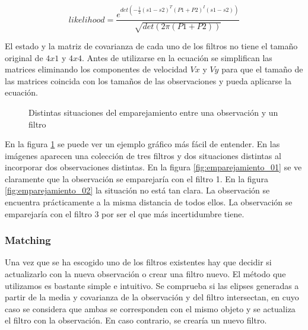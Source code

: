 \begin{equation}
\label{eq:likelihood}
likelihood = \frac{ e^{ det(-\frac{1}{2} (s1-s2)^T (P1+P2)^I (s1-s2) )} }
                  { \sqrt{ det(2\pi(P1+P2)) } }
\end{equation}

El estado y la matriz de covarianza de cada uno de los filtros no tiene el tamaño original de $4x1$ y $4x4$. Antes de utilizarse en la ecuación se simplifican las matrices eliminando los componentes de velocidad $Vx$ y $Vy$ para que el tamaño de las matrices coincida con los tamaños de las observaciones y pueda aplicarse la ecuación.\\

\begin{figure}[h]
  \centering
  \caption{Distintas situaciones del emparejamiento entre una observación y un filtro}
  \label{fig:emparejamientos}
\end{figure}

En la figura \ref{fig:emparejamientos} se puede ver un ejemplo gráfico más fácil de entender. En las imágenes aparecen una colección de tres filtros y dos situaciones distintas al incorporar dos observaciones distintas. En la figura \ref{fig:emparejamiento_01} se ve claramente que la observación se emparejaría con el filtro 1. En la figura \ref{fig:emparejamiento_02} la situación no está tan clara. La observación se encuentra prácticamente a la misma distancia de todos ellos. La observación se emparejaría con el filtro 3 por ser el que más incertidumbre tiene.

\subsubsection{Matching}
\label{subsubsec:Matching}

Una vez que se ha escogido uno de los filtros existentes hay que decidir si actualizarlo con la nueva observación o crear una filtro nuevo. El método que utilizamos es bastante simple e intuitivo. Se comprueba si las elipses generadas a partir de la media y covarianza de la observación y del filtro intersectan, en cuyo caso se considera que ambas se corresponden con el mismo objeto y se actualiza el filtro con la observación. En caso contrario, se crearía un nuevo filtro. \\

